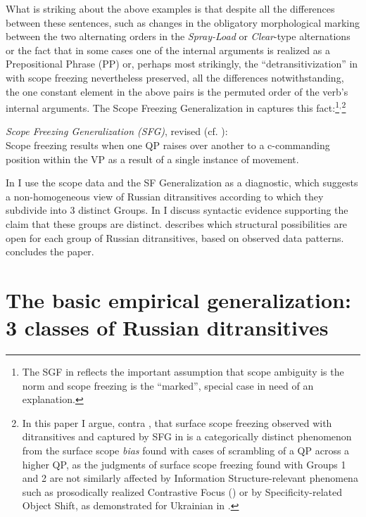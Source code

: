 \documentclass[output=paper,colorlinks,citecolor=brown,modfonts,nonflat]{langsci/langscibook}
\begin{document}
What is striking about the above examples is that despite all the differences between these sentences, such as changes in the obligatory morphological marking between the two alternating orders in the \textit{Spray-Load} or \textit{Clear}{}-type alternations or the fact that in some cases one of the internal arguments is realized as a Prepositional Phrase (PP) or, perhaps most strikingly, the “detransitivization” in  with scope freezing nevertheless preserved, all the differences notwithstanding, the one constant element in the above pairs is the permuted order of the verb’s internal arguments. The Scope Freezing Generalization in  captures this fact:\footnote{The SGF in  reflects the important assumption that scope ambiguity is the norm and scope freezing is the “marked”, special case in need of an explanation.}$^,$\footnote{In this paper I argue, contra \citet{Antonyuk2015}, that surface scope freezing observed with ditransitives and captured by SFG in  is a categorically distinct phenomenon from the surface scope \textit{bias} found with cases of scrambling of a QP across a higher QP, as the judgments of surface scope freezing found with Groups 1 and 2 are not similarly affected by Information Structure-relevant phenomena such as prosodically realized Contrastive Focus (\citealt{AntonyukLarson2016}) or by Specificity-related Object Shift, as demonstrated for Ukrainian in \citet{AntonyukMykhaylykInPress}.}

\ea%
    \label{ex:antonyuk:8}
    \textit{Scope Freezing Generalization (SFG)}, revised (cf. \citealt{Antonyuk2015}):\\
    Scope freezing results when one QP raises over another to a c-commanding position within the VP as a result of a single instance of movement.
    \z

In  I use the scope data and the SF Generalization as a diagnostic, which suggests a non-homogeneous view of Russian ditransitives according to which they subdivide into 3 distinct Groups. In  I discuss syntactic evidence supporting the claim that these groups are distinct.  describes which structural possibilities are open for each group of Russian ditransitives, based on observed data patterns.  concludes the paper.

\section{The basic empirical generalization: 3 classes of Russian ditransitives}\label{sec:antonyuk:2}
\end{document}
